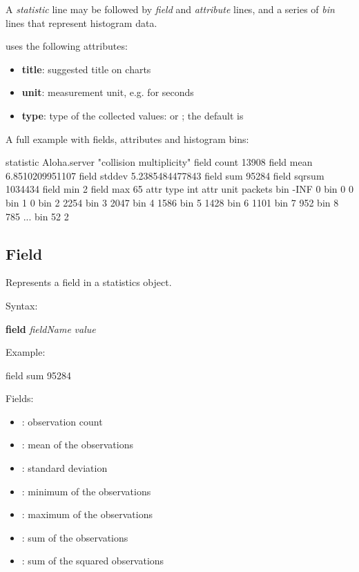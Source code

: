 A \textit{statistic} line may be followed by \textit{field} and \textit{attribute} lines,
and a series of \textit{bin} lines that represent histogram data.

{\opp} uses the following attributes:

\begin{itemize}
    \item \textbf{title}: suggested title on charts
    \item \textbf{unit}: measurement unit, e.g.  for seconds
    \item \textbf{type}: type of the collected values:  or ;
                         the default is 
\end{itemize}

A full example with fields, attributes and histogram bins:

\begin{filelisting}
statistic Aloha.server 	"collision multiplicity"
field count 13908
field mean 6.8510209951107
field stddev 5.2385484477843
field sum 95284
field sqrsum 1034434
field min 2
field max 65
attr type int
attr unit packets
bin	-INF	0
bin	0	0
bin	1	0
bin	2	2254
bin	3	2047
bin	4	1586
bin	5	1428
bin	6	1101
bin	7	952
bin	8	785
...
bin	52	2
\end{filelisting}


\subsection{Field}
\label{sec:result-file-formats:opp:field}

Represents a field in a statistics object.

Syntax:

\hspace{20mm} \textbf{field} \textit{fieldName} \textit{value}

Example:

\begin{filelisting}
field sum 95284
\end{filelisting}

Fields:

\begin{itemize}
    \item {}: observation count
    \item {}: mean of the observations
    \item {}: standard deviation
    \item {}: minimum of the observations
    \item {}: maximum of the observations
    \item {}: sum of the observations
    \item {}: sum of the squared observations
\end{itemize}

